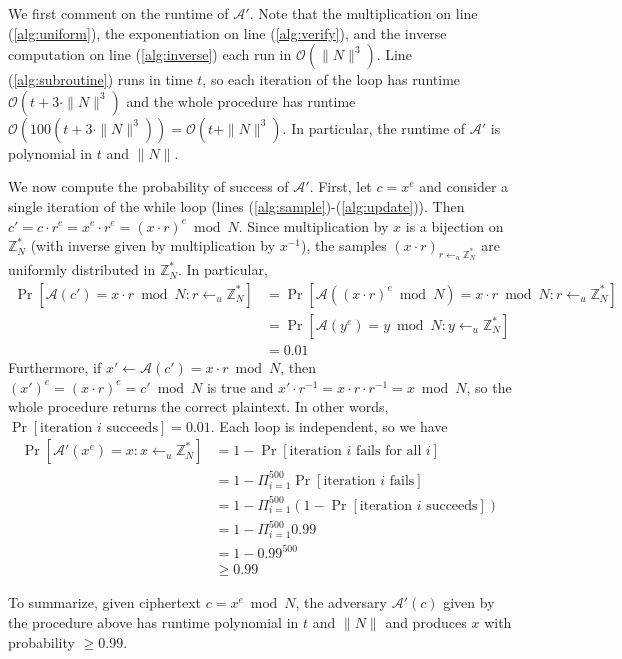 \documentclass[12pt]{article}
\numberwithin{equation}{section}
\theoremstyle{plain}
\DeclareMathOperator*{\prob}{Pr}
\newcommand{\adv}{\mathcal{A}}
\newcommand{\advv}{\mathcal{A}'}
\begin{document}
We first comment on the runtime of $\advv$.
Note that the multiplication on line (\ref{alg:uniform}),
the exponentiation on line (\ref{alg:verify}),
and the inverse computation on line (\ref{alg:inverse})
each run in $\mathcal{O}(\|N\|^3)$.
Line (\ref{alg:subroutine}) runs in time $t$,
so each iteration of the loop has runtime $\mathcal{O}(t + 3 \cdot \|N\|^3)$
and the whole procedure has runtime $\mathcal{O}(100 (t + 3 \cdot \|N\|^3)) = \mathcal{O}(t + \|N\|^3)$.
In particular, the runtime of $\advv$ is polynomial in $t$ and $\| N \|$.

We now compute the probability of success of $\advv$.
First, let $c = x^e$ and consider a single iteration of the while loop (lines (\ref{alg:sample})-(\ref{alg:update})).
Then $c' = c \cdot r^e = x^e \cdot r^e = (x \cdot r)^e \bmod N$.
Since multiplication by $x$ is a bijection on $\mathbb{Z}^*_N$ (with inverse given by multiplication by $x^{-1}$),
the samples $(x \cdot r)_{r \gets_u \mathbb{Z}^*_N}$ are uniformly distributed in $\mathbb{Z}^*_N$.
In particular,
\begin{align*}
    \prob[\adv(c') = x \cdot r \bmod N : r \gets_u \mathbb{Z}^*_N]
        &= \prob[\adv((x \cdot r)^e \bmod N) = x \cdot r \bmod N : r \gets_u \mathbb{Z}^*_N]\\
        &= \prob[\adv(y^e) = y \bmod N : y \gets_u \mathbb{Z}^*_N]\\
        &= 0.01
\end{align*}
Furthermore, if $x' \gets \adv(c') = x \cdot r \bmod N$, then $(x')^e = (x \cdot r)^e = c' \bmod N$ is true
and $x' \cdot r^{-1} = x \cdot r \cdot r^{-1} = x \bmod N$, so the whole procedure returns the correct plaintext.
In other words, $\prob[\text{iteration }i\text{ succeeds}] = 0.01$.
Each loop is independent, so we have
\begin{align*}
    \prob[\advv(x^e) = x : x \gets_u \mathbb{Z}^*_N]
        &= 1 - \prob[\text{iteration }i\text{ fails for all }i]\\
        &= 1 - \Pi_{i = 1}^{500} \prob[\text{iteration }i\text{ fails}]\\
        &= 1 - \Pi_{i = 1}^{500} (1 - \prob[\text{iteration }i\text{ succeeds}])\\
        &= 1 - \Pi_{i = 1}^{500} 0.99\\
        &= 1 - 0.99^{500}\\
        &\geq 0.99
\end{align*}

To summarize, given ciphertext $c = x^e \bmod N$, the adversary $\advv(c)$ given by the procedure above
has runtime polynomial in $t$ and $\|N\|$
and produces $x$ with probability $\geq 0.99$.
\end{document}
